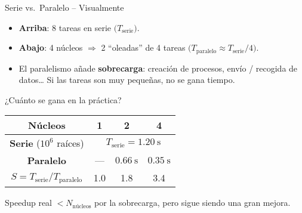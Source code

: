 \documentclass[10pt]{beamer}
\begin{document}
\begin{frame}{Serie vs.\ Paralelo – Visualmente}
\centering\small


\vspace{4mm}

\begin{itemize}
  \item \textbf{Arriba}: 8 tareas en serie \(\bigl(T_{\text{serie}}\bigr)\).
  \item \textbf{Abajo}: 4 núcleos $\Rightarrow$ 2 “oleadas” de 4 tareas  
        \(\bigl(T_{\text{paralelo}}\approx T_{\text{serie}}/4\bigr)\).
  \item El paralelismo añade \textbf{sobrecarga}: creación de procesos,
        envío / recogida de datos… Si las tareas son muy pequeñas, no se gana
        tiempo.
\end{itemize}
\end{frame}




\begin{frame}{¿Cuánto se gana en la práctica?}
\begin{center}
\begin{tabular}{c|ccc}
\hline
\textbf{Núcleos} & 1 & 2 & 4 \\
\hline
\textbf{Serie} (\(10^6\) raíces) & \multicolumn{3}{c}{\(\;T_{\text{serie}} = 1.20\ \text{s}\)} \\
\textbf{Paralelo} & --- & \(0.66\ \text{s}\) & \(0.35\ \text{s}\) \\
\(\displaystyle S = T_{\text{serie}}/T_{\text{paralelo}}\) & 1.0 & 1.8 & 3.4 \\
\hline
\end{tabular}
\end{center}

\small
Speedup real \(< N_{\text{núcleos}}\) por la sobrecarga, pero sigue siendo una
gran mejora.
\end{frame}
\end{document}
